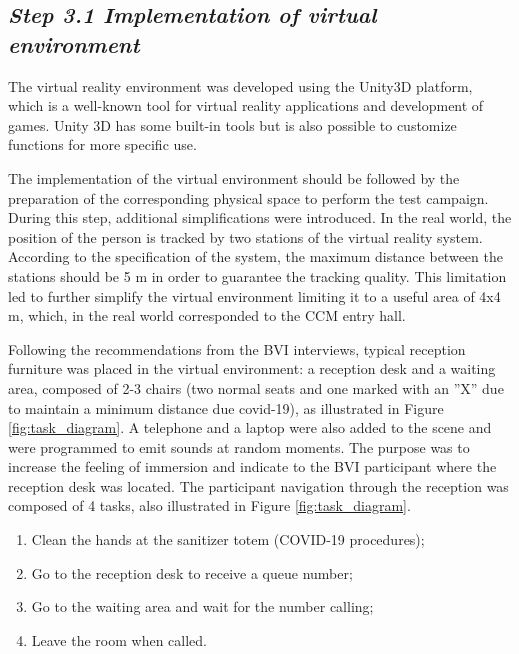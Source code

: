     \subsection*{\textit{Step 3.1 Implementation of virtual environment}}
    \label{subsec:virtual_world_creation}

        The virtual reality environment was developed using the Unity3D platform, which is a well-known tool for virtual reality applications and development of games. Unity 3D has some built-in tools but is also possible to customize functions for more specific use\cite{wang2010new}.
    
        The implementation of the virtual environment should be followed by the preparation of the corresponding physical space to perform the test campaign. During this step, additional simplifications were introduced. In the real world, the position of the person is tracked by two stations of the virtual reality system. According to the specification of the system, the maximum distance between the stations should be 5 m in order to guarantee the tracking quality. This limitation led to further simplify the virtual environment limiting it to a useful area of 4x4 m, which, in the real world corresponded to the CCM entry hall. 
        
        Following the recommendations from the BVI interviews, typical reception furniture was placed in the virtual environment: a reception desk and a waiting area, composed of 2-3 chairs (two normal seats and one marked with an ”X” due to maintain a minimum distance due covid-19), as illustrated in Figure \ref{fig:task_diagram}. A telephone and a laptop were also added to the scene and were programmed to emit sounds at random moments. The purpose was to increase the feeling of immersion and indicate to the BVI participant where the reception desk was located.
        The participant navigation through the reception was composed of 4 tasks, also illustrated in Figure \ref{fig:task_diagram}.
        
        \begin{enumerate}
            \item Clean the hands at the sanitizer totem (COVID-19 procedures);
            \item Go to the reception desk to receive a queue number;
            \item Go to the waiting area and wait for the number calling;
            \item Leave the room when called.
        \end{enumerate}
        
